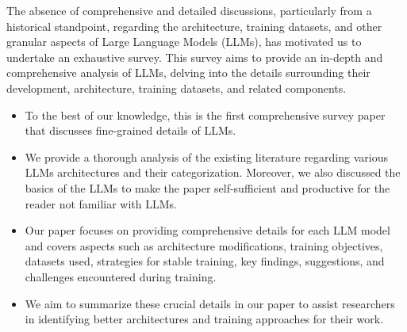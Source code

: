The absence of comprehensive and detailed discussions, particularly from a historical standpoint, regarding the architecture, training datasets, and other granular aspects of Large Language Models (LLMs), has motivated us to undertake an exhaustive survey. This survey aims to provide an in-depth and comprehensive analysis of LLMs, delving into the details surrounding their development, architecture, training datasets, and related components.
\begin{itemize}
\item To the best of our knowledge, this is the first comprehensive survey paper that discusses fine-grained details of LLMs. 
\item We provide a thorough analysis of the existing literature regarding various LLMs architectures
and their categorization. Moreover, we also discussed the basics of the LLMs to make the paper self-sufficient and productive for the reader not familiar with LLMs.




\item Our paper focuses on providing comprehensive details for each LLM model and covers aspects such as architecture modifications, training objectives, datasets used, strategies for stable training, key findings, suggestions, and challenges encountered during training.

\item We aim to summarize these crucial details in our paper to assist researchers in identifying better architectures and training approaches for their work.
\end{itemize}


